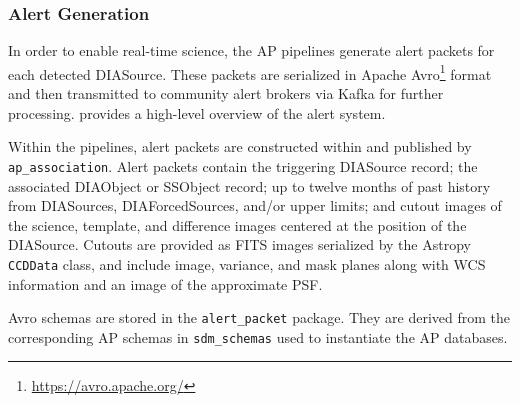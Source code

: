 \subsubsection{Alert Generation}
\label{sec:alerts}

In order to enable real-time science, the AP pipelines generate alert packets for each detected DIASource.
These packets are serialized in Apache Avro\footnote{\url{https://avro.apache.org/}} format and then transmitted to community alert brokers via Kafka for further processing.
\citet{DMTN-093} provides a high-level overview of the alert system.

Within the pipelines, alert packets are constructed within and published by \texttt{ap\_association}.
Alert packets contain the triggering DIASource record; the associated DIAObject or SSObject record; up to twelve months of past history from DIASources, DIAForcedSources, and/or upper limits; and cutout images of the science, template, and difference images centered at the position of the DIASource.
Cutouts are provided as FITS images serialized by the Astropy \texttt{CCDData} class, and include image, variance, and mask planes along with WCS information and an image of the approximate PSF.

Avro schemas are stored in the \texttt{alert\_packet} package.
They are derived from the corresponding AP schemas in \texttt{sdm\_schemas} used to instantiate the AP databases.
